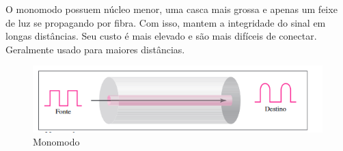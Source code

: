 \documentclass[12pt,a4, oneside, brazil]{article}
\begin{document}
	O monomodo possuem núcleo menor, uma casca mais grossa e apenas um feixe de luz se propagando por fibra. Com isso, mantem a integridade do sinal em longas distâncias. Seu custo é mais elevado e são mais difíceis de conectar. Geralmente usado para maiores distâncias.
	
	\begin{figure}[H]
		\centering
		\includegraphics[width=15cm]{monomodo}
		\caption{Monomodo}
		\label{fig:monomodo}
	\end{figure}



	
\end{document}
